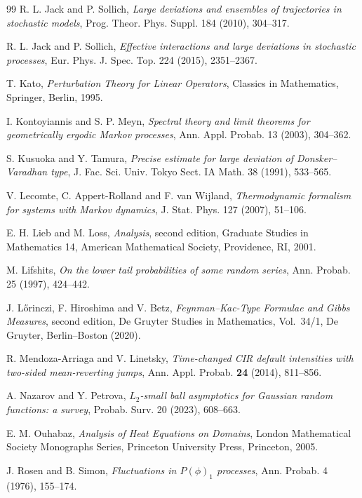\documentclass[11pt,reqno]{amsart}
\theoremstyle{definition}
\numberwithin{equation}{section}
\newcommand{\<}{\langle}
\renewcommand{\>}{\rangle}
\begin{document}
\begin{thebibliography}{99}
R. L. Jack and P. Sollich,
\emph{Large deviations and ensembles of trajectories in stochastic
models},
Prog. Theor. Phys. Suppl. 184 (2010), 304--317.

R. L. Jack and P. Sollich,
\emph{Effective interactions and large deviations in stochastic
processes},
Eur. Phys. J. Spec. Top. 224 (2015), 2351--2367.


T. Kato,
\emph{Perturbation Theory for Linear Operators},
Classics in Mathematics, Springer, Berlin, 1995.

I. Kontoyiannis and S. P. Meyn,
\emph{Spectral theory and limit theorems for geometrically ergodic Markov processes},
Ann. Appl. Probab. 13 (2003), 304--362.

S. Kusuoka and Y. Tamura,
\emph{Precise estimate for large deviation of Donsker--Varadhan type},
J. Fac. Sci. Univ. Tokyo Sect. IA Math. 38 (1991), 533--565.

V. Lecomte, C. Appert-Rolland and F. van Wijland,
\emph{Thermodynamic formalism for systems with Markov dynamics},
J. Stat. Phys. 127 (2007), 51--106.

E. H. Lieb and M. Loss,
\emph{Analysis}, second edition,
Graduate Studies in Mathematics 14, American Mathematical Society,
Providence, RI, 2001.

M. Lifshits,
\emph{On the lower tail probabilities of some random series},
Ann. Probab. 25 (1997), 424--442.

J. L{\H{o}}rinczi, F. Hiroshima and V. Betz,
\emph{Feynman--Kac-Type Formulae and Gibbs Measures},
second edition, De Gruyter Studies in Mathematics, Vol.~34/1,
De Gruyter, Berlin--Boston (2020).

R. Mendoza-Arriaga and V. Linetsky,
\emph{Time-changed CIR default intensities with two-sided mean-reverting jumps},
Ann. Appl. Probab. \textbf{24} (2014), 811--856.

A. Nazarov and Y. Petrova,
\emph{$L_2$-small ball asymptotics for Gaussian random functions: a survey},
Probab. Surv. 20 (2023), 608--663.

E. M. Ouhabaz,
\emph{Analysis of Heat Equations on Domains},
London Mathematical Society Monographs Series,
Princeton University Press, Princeton, 2005.


J. Rosen and B. Simon,
\emph{Fluctuations in $P(\phi)_1$ processes},
Ann. Probab. 4 (1976), 155--174.


\end{thebibliography}
\end{document}
